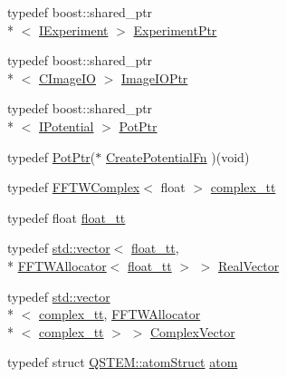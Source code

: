 \begin{DoxyCompactItemize}
\item 
typedef boost\-::shared\-\_\-ptr\\*
$<$ \hyperlink{class_q_s_t_e_m_1_1_i_experiment}{I\-Experiment} $>$ \hyperlink{namespace_q_s_t_e_m_a726e6914597164e389850f3db0512e7b}{Experiment\-Ptr}
\item 
typedef boost\-::shared\-\_\-ptr\\*
$<$ \hyperlink{class_q_s_t_e_m_1_1_c_image_i_o}{C\-Image\-I\-O} $>$ \hyperlink{namespace_q_s_t_e_m_a4983475ef18f1a1f4bbfaabb6d187b9a}{Image\-I\-O\-Ptr}
\item 
typedef boost\-::shared\-\_\-ptr\\*
$<$ \hyperlink{class_q_s_t_e_m_1_1_i_potential}{I\-Potential} $>$ \hyperlink{namespace_q_s_t_e_m_ae5a1cfb98b70a68e1c9b3fd1f50ab4b5}{Pot\-Ptr}
\item 
typedef \hyperlink{namespace_q_s_t_e_m_ae5a1cfb98b70a68e1c9b3fd1f50ab4b5}{Pot\-Ptr}($\ast$ \hyperlink{namespace_q_s_t_e_m_a3f54159e85da43c662b044e310591f3f}{Create\-Potential\-Fn} )(void)
\item 
typedef \hyperlink{class_f_f_t_w_complex}{F\-F\-T\-W\-Complex}$<$ float $>$ \hyperlink{namespace_q_s_t_e_m_afa320ea3cd2f5ff080c422f81b803a32}{complex\-\_\-tt}
\item 
typedef float \hyperlink{namespace_q_s_t_e_m_a915d7caa497280d9f927c4ce8d330e47}{float\-\_\-tt}
\item 
typedef \hyperlink{qmb_8m_af54b69a32590de218622e869b06b47b3}{std\-::vector}$<$ \hyperlink{namespace_q_s_t_e_m_a915d7caa497280d9f927c4ce8d330e47}{float\-\_\-tt}, \\*
\hyperlink{class_f_f_t_w_allocator}{F\-F\-T\-W\-Allocator}$<$ \hyperlink{namespace_q_s_t_e_m_a915d7caa497280d9f927c4ce8d330e47}{float\-\_\-tt} $>$ $>$ \hyperlink{namespace_q_s_t_e_m_a8dfe9e1dbecce3838cb082d96e991ba7}{Real\-Vector}
\item 
typedef \hyperlink{qmb_8m_af54b69a32590de218622e869b06b47b3}{std\-::vector}\\*
$<$ \hyperlink{namespace_q_s_t_e_m_afa320ea3cd2f5ff080c422f81b803a32}{complex\-\_\-tt}, \hyperlink{class_f_f_t_w_allocator}{F\-F\-T\-W\-Allocator}\\*
$<$ \hyperlink{namespace_q_s_t_e_m_afa320ea3cd2f5ff080c422f81b803a32}{complex\-\_\-tt} $>$ $>$ \hyperlink{namespace_q_s_t_e_m_af210a2c1f9afae1deed746dcd9276221}{Complex\-Vector}
\item 
typedef struct \hyperlink{struct_q_s_t_e_m_1_1atom_struct}{Q\-S\-T\-E\-M\-::atom\-Struct} \hyperlink{namespace_q_s_t_e_m_a402dabc31a7a1fe906d0cdd138c69686}{atom}

\end{DoxyCompactItemize}
